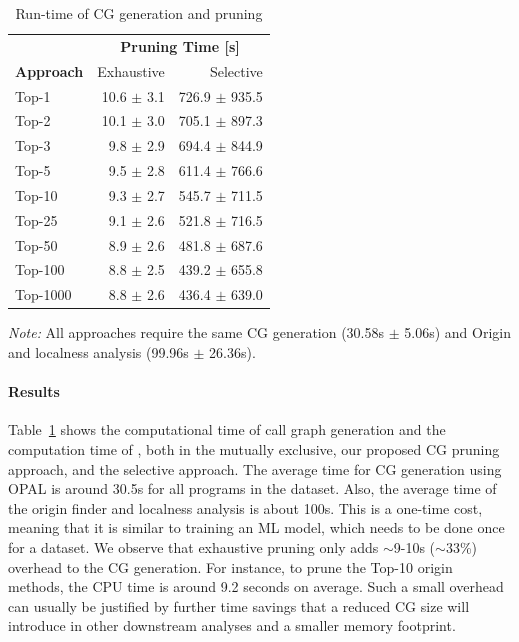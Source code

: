 \begin{table}
\centering
\caption{Run-time of CG generation and pruning}
\label{ch2:tab:cg_pruning_time}
\begin{threeparttable}
    \begin{tabular}{@{}lrr@{}}
\toprule
& \multicolumn{2}{c}{{\bf Pruning Time [s]}} \\
\cmidrule{2-3}
\textbf{Approach} & Exhaustive & Selective \\
\midrule
Top-1 & 10.6 $\pm$ 3.1 & 726.9 $\pm$ 935.5 \\
Top-2 & 10.1 $\pm$ 3.0 & 705.1 $\pm$ 897.3 \\
Top-3 & 9.8 $\pm$ 2.9 & 694.4 $\pm$ 844.9 \\
Top-5 & 9.5 $\pm$ 2.8 & 611.4 $\pm$ 766.6 \\
Top-10 & 9.3 $\pm$ 2.7 & 545.7 $\pm$ 711.5 \\
Top-25 & 9.1 $\pm$ 2.6 & 521.8 $\pm$ 716.5 \\
Top-50 & 8.9 $\pm$ 2.6 & 481.8 $\pm$ 687.6 \\
Top-100 & 8.8 $\pm$ 2.5 & 439.2 $\pm$ 655.8 \\
Top-1000 & 8.8 $\pm$ 2.6 & 436.4 $\pm$ 639.0 \\
\bottomrule
\end{tabular}
\begin{tablenotes}
    \item \emph{Note:} All approaches require the same CG
generation (30.58s $\pm$ 5.06s) and Origin 
and localness analysis (99.96s $\pm$ 26.36s).
\end{tablenotes}
\end{threeparttable}
\end{table}

\paragraph{Results}
Table~\ref{ch2:tab:cg_pruning_time} shows the computational time of call graph generation and the computation time of , both in the mutually exclusive, our proposed CG pruning approach, and the selective approach. The average time for CG generation using OPAL is around 30.5s for all programs in the dataset.
Also, the average time of the origin finder and localness analysis is about 100s. This is a one-time cost, meaning that it is similar to training an ML model, which needs to be done once for a dataset. We observe that exhaustive pruning only adds $\sim$9-10s ($\sim$33\%) overhead to the CG generation. For instance, to prune the Top-10 origin methods, the CPU time is around 9.2 seconds on average.
Such a small overhead can usually be justified by further time savings that a reduced CG size will introduce in other downstream analyses and a smaller memory footprint.


